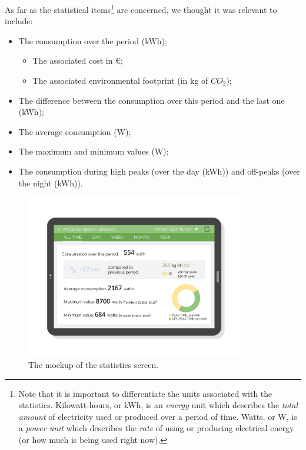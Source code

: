 \documentclass[a4paper, oneside, 11pt]{book}
\begin{document}
As far as the statistical items\footnote{Note that it is important to differentiate the units associated with the statistics. Kilowatt-hours, or kWh, is an \emph{energy} unit which describes the \emph{total amount} of electricity used or produced over a period of time. Watts, or W, is a \emph{power unit} which describes the \emph{rate} of using or producing electrical energy (or how much is being used right now).}  are concerned, we thought it was relevant to include:
\begin{itemize}
	\item The consumption over the period (kWh);
	\begin{itemize}
		\item The associated cost in \euro;
		\item The associated environmental footprint (in kg of \(CO_2\));
	\end{itemize}
	\item The difference between the consumption over this period and the last one (kWh);
	\item The average consumption (W);
	\item The maximum and minimum values (W);
	\item The consumption during high peaks (over the day (kWh)) and off-peaks (over the night (kWh)).
\end{itemize}

\begin{figure}[htbp]
	\centerline{\includegraphics[width=0.85\textwidth]{stat_activity_mockup.pdf}}
	\caption{The mockup of the statistics screen.}
	\label{fig:stat_activity_mockup}
\end{figure}
\end{document}

